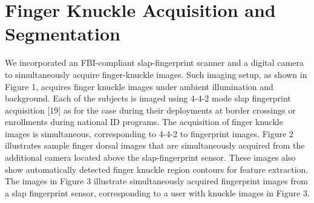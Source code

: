 \section{Finger Knuckle Acquisition and Segmentation}

We incorporated an FBI-compliant slap-fingerprint scanner and a digital camera to simultaneously acquire finger-knuckle images. Such imaging setup, as shown in Figure 1, acquires finger knuckle images under ambient illumination and background. Each of the subjects is imaged using 4-4-2 mode slap fingerprint acquisition [19] as for the case during their deployments at border crossings or enrollments during national ID programs. The acquisition of finger knuckle images is simultaneous, corresponding to 4-4-2 to fingerprint images. Figure 2 illustrates sample finger dorsal images that are simultaneously acquired from the additional camera located above the slap-fingerprint sensor. These images also show automatically detected finger knuckle region contours for feature extraction. The images in Figure 3 illustrate simultaneously acquired fingerprint images from a slap fingerprint sensor, corresponding to a user with knuckle images in Figure 3.


